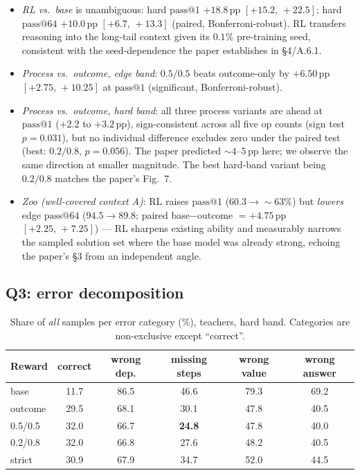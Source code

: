 \documentclass[11pt]{article}
\makeatletter
\newcommand{\passk}[1]{\ensuremath{\mathrm{pass}@#1}}
\newcommand{\pp}{\,\mathrm{pp}}
\newcommand{\ci}[2]{\ensuremath{[#1,\,#2]}}
\makeatother
\begin{document}
\begin{itemize}[leftmargin=1.4em,itemsep=2pt]
\item \emph{RL vs.\ base} is unambiguous: hard \passk{1} $+18.8\pp$
\ci{+15.2}{+22.5}; hard \passk{64} $+10.0\pp$ \ci{+6.7}{+13.3} (paired,
Bonferroni-robust). RL transfers reasoning into the long-tail context given its
$0.1\%$ pre-training seed, consistent with the seed-dependence the paper establishes in
\S4/A.6.1.
\item \emph{Process vs.\ outcome, edge band}: $0.5/0.5$ beats outcome-only by
$\bm{+6.50\pp}$ \ci{+2.75}{+10.25} at \passk{1} (significant, Bonferroni-robust).
\item \emph{Process vs.\ outcome, hard band}: all three process variants are ahead at
\passk{1} ($+2.2$ to $+3.2\pp$), sign-consistent across all five op counts
(sign test $p = 0.031$), but no individual difference excludes zero under the paired
test (best: $0.2/0.8$, $p = 0.056$). The paper predicted ${\sim}4$--$5\pp$ here; we
observe the same direction at smaller magnitude. The best hard-band variant being
$0.2/0.8$ matches the paper's Fig.~7.
\item \emph{Zoo (well-covered context A)}: RL raises \passk{1}
($60.3 \to {\sim}63\%$) but \emph{lowers} edge \passk{64} ($94.5 \to 89.8$;
paired base$-$outcome $= +4.75\pp$ \ci{+2.25}{+7.25}) --- RL sharpens existing
ability and measurably narrows the sampled solution set where the base model was
already strong, echoing the paper's \S3 from an independent angle.
\end{itemize}

\subsection{Q3: error decomposition}

\begin{table}[h]
\centering
\caption{Share of \emph{all} samples per error category (\%), teachers, hard band.
Categories are non-exclusive except ``correct''.}
\label{tab:err}
\small
\begin{tabular}{lccccc}
\toprule
Reward & correct & wrong dep. & missing steps & wrong value & wrong answer \\
\midrule
base    & 11.7 & 86.5 & 46.6 & 79.3 & 69.2 \\
outcome & 29.5 & 68.1 & 30.1 & 47.8 & 40.5 \\
0.5/0.5 & 32.0 & 66.7 & \textbf{24.8} & 47.8 & 40.0 \\
0.2/0.8 & 32.0 & 66.8 & 27.6 & 48.2 & 40.5 \\
strict  & 30.9 & 67.9 & 34.7 & 52.0 & 44.5 \\
\bottomrule
\end{tabular}
\end{table}
\end{document}
